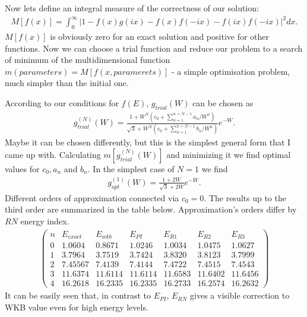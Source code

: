 \documentclass{article}
\begin{document}
Now lets define an integral measure of the correctness of our solution:
\begin{eqnarray}
M[f(x)]=\int_0^\infty |1-f(x)g(ix)-f(x)f(-ix)-f(ix)f(-ix)|^2 dx. \label{IM}
\end{eqnarray}
$M[f(x)]$ is obviously zero for an exact solution and positive for other functions. Now we can choose a trial function and reduce our problem to a search of minimum of the multidimensional function $m(parameters)=M[f(x,paramerets)]$ - a simple optimisation problem, much simpler than the initial one.

According to our conditions for $f(E)$, $g_{trial}(W)$ can be chosen as
\begin{eqnarray}
g_{trial}^{(N)}(W) = 
\frac{1+W^{N} \left(c_0 + \sum_{n=1}^{n=N-1}{a_n/W^n}\right)}
{\sqrt{3}+W^{N} \left(c_0 + \sum_{n=1}^{n=N-1}{b_n/W^n}\right)} e^{-W}. \label{trial}
\end{eqnarray} 
Maybe it can be chosen differently, but this is the simplest general form that I came up with. Calculating $m[g_{trial}^{(N)}(W)]$
and minimizing it we find optimal values for $c_0, a_n$ and $b_n$. In the simplest case of $N=1$ we find
\begin{eqnarray}
g_{opt}^{(1)}(W) = \frac{1+2 W}{\sqrt{3}+2 W} e^{-W}. \label{opt1}
\end{eqnarray}
Different orders of approximation connected via $c_0=0$. The results up to the third order are summarized in the table below. Approximation's orders differ by $RN$ energy index.
\begin{eqnarray}
\left( \begin{array}{c|c|c|c|c|c|c}
\hline
n & E_{exact}  & E_{wkb} & E_{PI} & E_{R1} & E_{R2} & E_{R3} \\
\hline
0 & 1.0604 & 0.8671&   1.0246 & 1.0034 & 1.0475 & 1.0627\\
1 & 3.7964 & 3.7519 &   3.7424 & 3.8320 & 3.8123 & 3.7999\\
2 & 7.45567 & 7.4139 &  7.4144 & 7.4722 & 7.4515 & 7.4543\\
3 & 11.6374 & 11.6114 &  11.6114 & 11.6583 & 11.6402 & 11.6456\\
4 & 16.2618 & 16.2335 &  16.2335 & 16.2733 & 16.2574 & 16.2632
\nonumber
\end{array}\right)
\end{eqnarray}
It can be easily seen that, in contrast to $E_{PI}$, $E_{RN}$ gives a visible correction to WKB value even for high energy levels.
\end{document}

